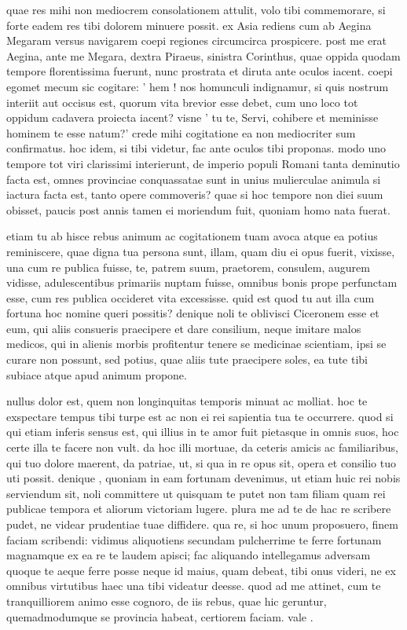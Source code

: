  quae res mihi non mediocrem consolationem attulit, volo tibi commemorare, si forte eadem res tibi dolorem minuere possit. ex Asia rediens cum ab Aegina Megaram versus navigarem coepi regiones circumcirca prospicere. post me erat Aegina, ante me Megara, dextra Piraeus, sinistra Corinthus, quae oppida quodam tempore florentissima fuerunt, nunc prostrata et diruta ante oculos iacent. coepi egomet mecum sic cogitare: ' hem ! nos homunculi indignamur, si quis nostrum interiit aut occisus est, quorum vita brevior esse debet, cum uno loco tot oppidum cadavera proiecta iacent? visne ' tu te, Servi, cohibere et meminisse hominem te esse natum?' crede mihi cogitatione ea non mediocriter sum confirmatus. hoc idem, si tibi videtur, fac ante oculos tibi proponas. modo uno tempore tot viri clarissimi interierunt, de imperio populi Romani tanta deminutio facta est, omnes provinciae conquassatae sunt in unius mulierculae animula si iactura facta est, tanto opere commoveris? quae si hoc tempore non diei suum obisset, paucis post annis tamen ei moriendum fuit, quoniam homo nata fuerat.

 etiam tu ab hisce rebus animum ac cogitationem tuam avoca atque ea potius reminiscere, quae digna tua persona sunt, illam, quam diu ei opus fuerit, vixisse, una cum re publica fuisse, te, patrem suum, praetorem, consulem, augurem vidisse, adulescentibus primariis nuptam fuisse, omnibus bonis prope perfunctam esse, cum res publica occideret vita excessisse. quid est quod tu aut illa cum fortuna hoc nomine queri possitis? denique noli te oblivisci Ciceronem esse et eum, qui aliis consueris praecipere et dare consilium, neque imitare malos medicos, qui in alienis morbis profitentur tenere se medicinae scientiam, ipsi se curare non possunt, sed potius, quae aliis tute praecipere soles, ea tute tibi subiace atque apud animum propone.

 nullus dolor est, quem non longinquitas temporis minuat ac molliat. hoc te exspectare tempus tibi turpe est ac non ei rei sapientia tua te occurrere. quod si qui etiam inferis sensus est, qui illius in te amor fuit pietasque in omnis suos, hoc certe illa te facere non vult. da hoc illi mortuae, da ceteris amicis ac familiaribus, qui tuo dolore maerent, da patriae, ut, si qua in re opus sit, opera et consilio tuo uti possit. denique , quoniam in eam fortunam devenimus, ut etiam huic rei nobis serviendum sit, noli committere ut quisquam te putet non tam filiam quam rei publicae tempora et aliorum victoriam lugere. plura me ad te de hac re scribere pudet, ne videar prudentiae tuae diffidere. qua re, si hoc unum proposuero, finem faciam scribendi: vidimus aliquotiens secundam pulcherrime te ferre fortunam magnamque ex ea re te laudem apisci; fac aliquando intellegamus adversam quoque te aeque ferre posse neque id maius, quam debeat, tibi onus videri, ne ex omnibus virtutibus haec una tibi videatur deesse. quod ad me attinet, cum te tranquilliorem animo esse cognoro, de iis rebus, quae hic geruntur, quemadmodumque se provincia habeat, certiorem faciam. vale .
